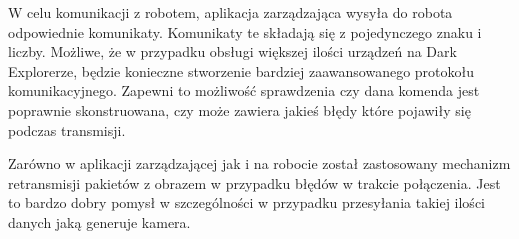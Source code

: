 W celu komunikacji z robotem, aplikacja zarządzająca wysyła do robota odpowiednie komunikaty. Komunikaty te składają się z pojedynczego znaku i liczby. Możliwe, że w przypadku obsługi większej ilości urządzeń na Dark Explorerze, będzie konieczne stworzenie bardziej zaawansowanego protokołu komunikacyjnego. Zapewni to możliwość sprawdzenia czy dana komenda jest poprawnie skonstruowana, czy może zawiera jakieś błędy które pojawiły się podczas transmisji.

Zarówno w aplikacji zarządzającej jak i na robocie został zastosowany mechanizm retransmisji pakietów z obrazem w przypadku błędów w trakcie połączenia. Jest to bardzo dobry pomysł w szczególności w przypadku przesyłania takiej ilości danych jaką generuje kamera. 